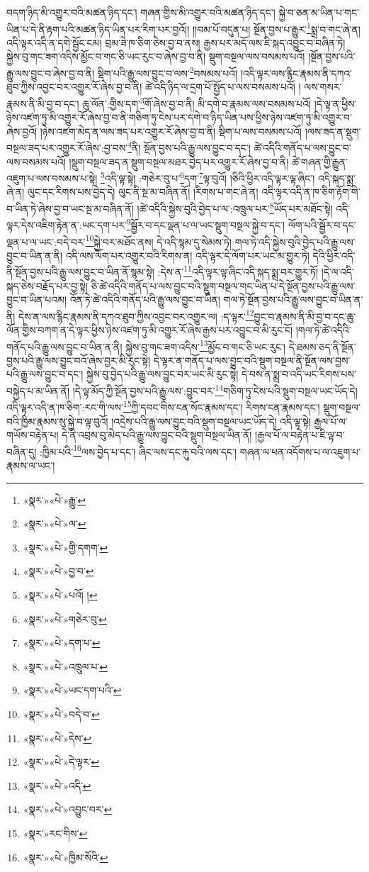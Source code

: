 བདག་ཉིད་མི་འགྱུར་བའི་མཚན་ཉིད་དང་། གཞན་གྱིས་མི་འགྱུར་བའི་མཚན་ཉིད་དང་། སྐྱེ་བ་ཅན་མ་ཡིན་པ་གང་ཡིན་པ་དེ་ནི་རྟག་པའི་མཚན་ཉིད་ཡིན་པར་རིག་པར་བྱའོ།། །།བམ་པོ་བདུན་པ། སྔོན་བྱས་པ་རྒྱུར་\footnote{«སྣར་»«པེ་»རྒྱུ་}སྨྲ་བ་གང་ཞེ་ན། འདི་ལྟར་འདི་ན་དགེ་སྦྱོང་ངམ། བྲམ་ཟེ་ཁ་ཅིག་ཅེས་བྱ་བ་ནས། རྒྱས་པར་མདོ་ལས་ཇི་སྐད་འབྱུང་བ་བཞིན་ཏེ། སྐྱེས་བུ་གང་ཟག་འདིས་མྱོང་བ་གང་ཅི་ཡང་རུང་བ་ཞེས་བྱ་བ་ནི། སྡུག་བསྔལ་ལས་བསམས་པའོ། །སྔོན་བྱས་པའི་རྒྱུ་ལས་བྱུང་བ་ཞེས་བྱ་བ་ནི། སྡིག་པའི་རྒྱུ་ལས་བྱུང་བ་ལས་\footnote{«སྣར་»«པེ་»ལ་}བསམས་པའོ། །འདི་ལྟར་ལས་རྙིང་རྣམས་ནི་དཀའ་ཐུབ་ཀྱིས་འབྱང་བར་འགྱུར་རོ་ཞེས་བྱ་བ་ནི། ཚེ་འདི་ཉིད་ལ་དྲག་པོ་སྤྱོད་པ་ལས་བསམས་པའོ། །
ལས་གསར་རྣམས་ནི་མི་བྱ་བ་དང་། ཆུ་ལོན་:གྱིས་དག་\footnote{«སྣར་»«པེ་»གྱི་དགག་}གོ་ཞེས་བྱ་བ་ནི། མི་དགེ་བ་རྣམས་ལས་བསམས་པའོ། །དེ་ལྟ་ན་ཕྱིས་ཉེས་འཛག་ཏུ་མི་འགྱུར་རོ་ཞེས་བྱ་བ་ནི་གཅིག་ཏུ་ངེས་པར་དགེ་བ་ཉིད་ཡིན་པས་ཕྱིས་ཉེས་འཛག་ཏུ་མི་འགྱུར་བ་ཞེས་བྱའོ། །ཉེས་འཛག་མེད་ན་ལས་ཟད་པར་འགྱུར་རོ་ཞེས་བྱ་བ་ནི། སྡིག་པ་ལས་བསམས་པའོ། །ལས་ཟད་ན་སྡུག་བསྔལ་ཟད་པར་འགྱུར་རོ་ཞེས་:བྱ་བས་\footnote{«སྣར་»«པེ་»བྱ་བ་}ནི། སྔོན་བྱས་པའི་རྒྱུ་ལས་བྱུང་བ་དང་། ཚེ་འདིའི་གནོད་པ་ལས་བྱུང་བ་ལས་བསམས་པའོ། །སྡུག་བསྔལ་ཟད་ན་སྡུག་བསྔལ་མཐར་བྱེད་པར་འགྱུར་རོ་ཞེས་བྱ་བ་ནི། ཚེ་གཞན་གྱི་རྒྱུན་འཇུག་པ་ལས་བསམས་པ་སྟེ། \footnote{«སྣར་»«པེ་»པའོ། ། }འདི་ལྟ་སྟེ། :གཅེར་བུ་པ་\footnote{«སྣར་»«པེ་»གཅེར་བུ་}དག་\footnote{«སྣར་»«པེ་»དག་པ་}ལྟ་བུའོ། །ཅིའི་ཕྱིར་འདི་ལྟར་ལྟ་ཞིང་། འདི་སྐད་སྨྲ་ཞེ་ན། ལུང་དང་རིགས་པས་བྱེད་དེ། ལུང་ནི་སྔ་མ་བཞིན་ནོ། །རིགས་པ་གང་ཞེ་ན། འདི་ལྟར་འདི་ན་ཁ་ཅིག་རྟོག་གེ་བ་ཡིན་ཏེ་ཞེས་བྱ་བ་ཡང་སྔ་མ་བཞིན་ནོ། །ཚེ་འདིའི་སྐྱེས་བུའི་བྱེད་པ་ལ་:འཁྲུལ་པར་\footnote{«སྣར་»«པེ་»འཁྲུལ་པ་}ཡོད་པར་མཐོང་སྟེ། འདི་ལྟར་དེས་འཇིག་རྟེན་ན་:ཡང་དག་པར་\footnote{«སྣར་»«པེ་»ཡང་དག་པའི་}སྦྱོར་བ་དང་ལྡན་པ་ལ་ཡང་སྡུག་བསྔལ་སྐྱེ་བ་དང་། ལོག་པའི་སྦྱོར་བ་དང་ལྡན་པ་ལ་ཡང་:བདེ་བར་\footnote{«སྣར་»«པེ་»བདེ་བ་}སྐྱེ་བར་མཐོང་ནས། དེ་འདི་སྙམ་དུ་སེམས་ཏེ། གལ་ཏེ་འདི་སྐྱེས་བུའི་བྱེད་པའི་རྒྱུ་ལས་བྱུང་བ་ཡིན་ན་ནི། འདི་ལས་ལོག་པར་འགྱུར་བའི་རིགས་ན། འདི་ལྟར་དེ་ལོག་པར་ཡང་མ་གྱུར་ཏེ། དེའི་ཕྱིར་འདི་ནི་སྔོན་བྱས་པའི་རྒྱུ་ལས་བྱུང་བ་ཡིན་ནོ་སྙམ་སྟེ། :དེས་ན་\footnote{«སྣར་»«པེ་»དེས་}འདི་ལྟར་ལྟ་ཞིང་འདི་སྐད་སྨྲ་བར་གྱུར་ཏོ། །དེ་ལ་འདི་སྐད་ཅེས་བརྗོད་པར་བྱ་སྟེ། ཅི་ཚེ་འདིའི་གནོད་པ་ལས་བྱུང་བའི་སྡུག་བསྔལ་གང་ཡིན་པ་དེ་སྔོན་བྱས་པའི་རྒྱུ་ལས་བྱུང་བ་ཡིན་པའམ། འོན་ཏེ་ཚེ་འདིའི་གནོད་པའི་རྒྱུ་ལས་བྱུང་བ་ཡིན། གལ་ཏེ་སྔོན་བྱས་པའི་རྒྱུ་ལས་བྱུང་བ་ཡིན་ན་ནི། དེས་ན་ལས་རྙིང་རྣམས་ནི་དཀའ་ཐུབ་ཀྱིས་འབྱང་བར་འགྱུར་ལ། :ད་ལྟར་\footnote{«སྣར་»«པེ་»དེ་ལྟར་}བྱུང་བ་རྣམས་ནི་མི་བྱ་བ་དང་ཆུ་ལོན་གྱིས་བཀག་ན་དེ་ལྟར་ཕྱིས་ཉེས་འཛག་ཏུ་མི་འགྱུར་རོ་ཞེས་རྒྱས་པར་འབྱུང་བ་མི་རུང་ངོ། །གལ་ཏེ་ཚེ་འདིའི་གནོད་པའི་རྒྱུ་ལས་བྱུང་བ་ཡིན་ན་ནི། སྐྱེས་བུ་གང་ཟག་འདིས་\footnote{«སྣར་»«པེ་»འདི་}མྱོང་བ་གང་ཅི་ཡང་རུང་། དེ་ཐམས་ཅད་ནི་སྔོན་བྱས་པའི་རྒྱུ་ལས་བྱུང་བའོ་ཞེས་བྱར་མི་རུང་སྟེ། དེ་ལྟར་ན་གནོད་པ་ལས་བྱུང་བའི་སྡུག་བསྔལ་ནི་སྔོན་ལས་བྱས་པའི་རྒྱུ་ལས་བྱུང་བ་དང་། སྐྱེས་བུ་བྱེད་པའི་རྒྱུ་ལས་བྱུང་བར་ཡང་མི་རུང་སྟེ། དེ་བས་ན་སྨྲ་བ་འདི་ཡང་རིགས་པས་བསྐྱེད་པ་མ་ཡིན་ནོ། །དེ་ལྟ་མོད་ཀྱི་སྔོན་བྱས་པའི་རྒྱུ་ལས་:བྱུང་བར་\footnote{«སྣར་»«པེ་»འབྱུང་བར་}གཅིག་ཏུ་ངེས་པའི་སྡུག་བསྔལ་ཡང་ཡོད་དེ། འདི་ལྟར་འདི་ན་ཁ་ཅིག་:རང་གི་ལས་\footnote{«སྣར་»རང་གིས་}ཀྱི་དབང་གིས་ངན་སོང་རྣམས་དང་། རིགས་ངན་རྣམས་དང་། སྡུག་བསྔལ་བའི་ཁྱིམ་རྣམས་སུ་སྐྱེ་བ་ལྟ་བུའོ། །འདྲེས་པའི་རྒྱུ་ལས་བྱུང་བའི་སྡུག་བསྔལ་ཡང་ཡོད་དེ། འདི་ལྟ་སྟེ། རྒྱལ་པོ་ལ་གཡོས་བརྟེན་པ། དེ་ནི་འབྲས་བུ་མེད་པའི་རྒྱུ་ལས་བྱུང་བའི་སྡུག་བསྔལ་ཡིན་ནོ། །རྒྱལ་པོ་ལ་བརྟེན་པ་ཇི་ལྟ་བ་བཞིན་དུ། :ཁྱིམ་པའི་\footnote{«སྣར་»«པེ་»ཁྱིམ་སོའི་}ལས་བྱེད་པ་དང་། ཞིང་ལས་དང་རྐུ་བའི་ལས་དང་། གཞན་ལ་ཕན་འདོགས་པ་ལ་འཇུག་པ་རྣམས་ལ་ཡང་། 